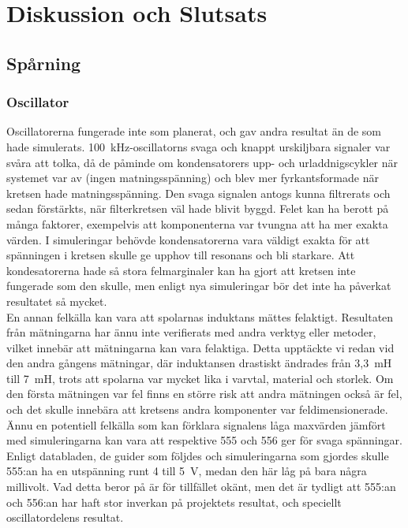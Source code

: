\documentclass[a4paper]{article}
\begin{document}
\begin{sloppypar}
  \section{Diskussion och Slutsats}
  \subsection{Spårning}
  \subsubsection{Oscillator}
  Oscillatorerna fungerade inte som planerat, och gav andra resultat än de som hade simulerats.
  100~kHz-oscillatorns svaga och knappt urskiljbara signaler var svåra att tolka, då de påminde om kondensatorers upp- och urladdnigscykler när systemet var av (ingen matningsspänning) och blev mer fyrkantsformade när kretsen hade matningsspänning.
  Den svaga signalen antogs kunna filtrerats och sedan förstärkts, när filterkretsen väl hade blivit byggd.
  Felet kan ha berott på många faktorer, exempelvis att komponenterna var tvungna att ha mer exakta värden.
  I simuleringar behövde kondensatorerna vara väldigt exakta för att spänningen i kretsen skulle ge upphov till resonans och bli starkare.
  Att kondesatorerna hade så stora felmarginaler kan ha gjort att kretsen inte fungerade som den skulle, men enligt nya simuleringar bör det inte ha påverkat resultatet så mycket.
  \\
  En annan felkälla kan vara att spolarnas induktans mättes felaktigt. Resultaten från mätningarna har ännu inte verifierats med andra verktyg eller metoder, vilket innebär att mätningarna kan vara felaktiga.
  Detta upptäckte vi redan vid den andra gångens mätningar, där induktansen drastiskt ändrades från 3,3~mH till 7~mH, trots att spolarna var mycket lika i varvtal, material och storlek. Om den första mätningen var fel finns en större risk att andra mätningen också är fel, och det skulle innebära att kretsens andra komponenter var feldimensionerade.
  \\
  Ännu en potentiell felkälla som kan förklara signalens låga maxvärden jämfört med simuleringarna kan vara att respektive 555 och 556 ger för svaga spänningar. Enligt databladen, de guider som följdes och simuleringarna som gjordes skulle 555:an ha en utspänning runt 4 till 5~V, medan den här låg på bara några millivolt.
  Vad detta beror på är för tillfället okänt, men det är tydligt att 555:an och 556:an har haft stor inverkan på projektets resultat, och speciellt oscillatordelens resultat.

\end{sloppypar}
\end{document}
